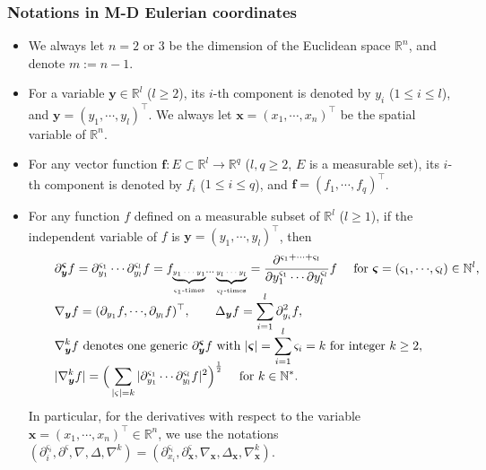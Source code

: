 \documentclass[11pt,reqno]{amsart}
\numberwithin{rk}{section}
\numberwithin{prop}{section}
\numberwithin{mydef}{section}
\numberwithin{lem}{section}
\numberwithin{equation}{section}
\numberwithin{thm}{section}
\begin{document}
\subsubsection{Notations in M-D Eulerian coordinates} 
\begin{itemize}
\smallskip
\item We always let $n=2$ or $3$ be the dimension of the Euclidean  space $\mathbb{R}^n$, and denote  $m:=n-1$.
\smallskip
\item For a variable $\boldsymbol{y} \in \mathbb{R}^l$ ($l\geq 2$), its $i$-th component is denoted by $y_i$ ($1\leq i\leq l$), and $\boldsymbol{y} = (y_1, \cdots\!, y_l)^\top$.  We always let $\boldsymbol{x}=(x_1,\cdots\!,x_n)^\top$ be the spatial variable of $\mathbb{R}^n$.
\smallskip
\item For any vector function $\boldsymbol{f}: E\subset \mathbb{R}^l \to \mathbb{R}^q$ ($l,q\geq 2$, $E$ is a measurable set), its $i$-th component is denoted by $f_i$ ($1\leq i\leq q$), and $\boldsymbol{f} = (f_1, \cdots\!, f_q)^\top$.
\smallskip
\item For any function $f$ defined on a measurable subset of $\mathbb{R}^l$ ($l\geq 1$), if the independent variable of $f$ is $\boldsymbol{y}=(y_1,\cdots\!,y_l)^\top$, then 
\begin{align*}
&\qquad \partial_{\boldsymbol{y}}^{\boldsymbol{\varsigma}} f=\partial_{y_1}^{\varsigma_1}\cdots\partial_{y_l}^{\varsigma_l} f=f_{\underbrace{\text{\tiny$y_1\cdots y_1$}}_{\text{$\varsigma_1$-times}}\cdots\underbrace{\text{\tiny$y_l\cdots y_l$}}_{\text{$\varsigma_l$-times}}}= \frac{\partial^{\varsigma_1+\cdots+ \varsigma_l}}{\partial y_1^{\varsigma_1}\cdots \partial y_l^{\varsigma_l}}f \quad\ \text{for }\boldsymbol{\varsigma}=(\varsigma_1,\cdots\!,\varsigma_l)\in \mathbb{N}^l,\\[-7pt]
&\qquad \nabla_{\boldsymbol{y}} f=(\partial_{y_1} f,\cdots\!,\partial_{y_l} f)^\top,\qquad \Delta_{\boldsymbol{y}} f=\sum_{i=1}^l \partial_{y_i}^2 f,\\[-7pt]
&\qquad \nabla_{\boldsymbol{y}}^k f \text{ denotes one generic } \partial_{\boldsymbol{y}}^{\boldsymbol{\varsigma}} f \text{ with }|\boldsymbol{\varsigma}|=\sum_{i=1}^l \varsigma_i=k \text{ for integer }k\geq 2,\\[-7pt]
&\qquad |\nabla_{\boldsymbol{y}}^k f|=\Big(\sum_{|\varsigma|=k}|\partial_{y_1}^{\varsigma_1} \cdots\partial^{\varsigma_l}_{y_l}f|^2\Big)^\frac{1}{2} \quad\text{ for } k\in \mathbb{N}^*.
\end{align*}
In particular, for the derivatives with respect to the
variable $\boldsymbol{x}=(x_1,\cdots\!,x_n)^\top\in \mathbb{R}^n$, we use the notations 
$(\partial_i^{\varsigma_i},\partial^{\boldsymbol{\varsigma}},\nabla,\Delta,\nabla^k)=(\partial_{x_i}^{\varsigma_i}, \partial_{\boldsymbol{x}}^{\boldsymbol{\varsigma}},\nabla_{\boldsymbol{x}},\Delta_{\boldsymbol{x}},\nabla_{\boldsymbol{x}}^k)$.


\end{itemize}
\end{document}
